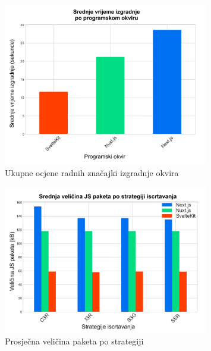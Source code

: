 \begin{figure}[H]
    \centering
    \includegraphics[width=0.8\textwidth]{slike/rezultati/dodatne-metrike/overall_framework_build_performance.png}
    \caption{Ukupne ocjene radnih značajki izgradnje okvira}
    \label{fig:overall_framework_build_performance}
\end{figure}

\begin{figure}[H]
    \centering
    \includegraphics[width=0.8\textwidth]{slike/rezultati/dodatne-metrike/average_bundle_size_by_strategy.png}
    \caption{Prosječna veličina paketa po strategiji}
    \label{fig:average_bundle_size_by_strategy}
\end{figure}

